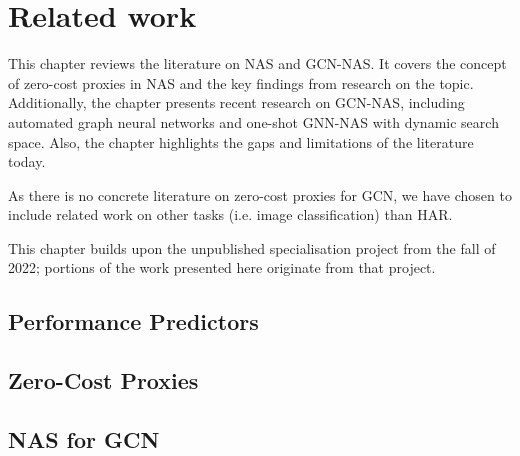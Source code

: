 \chapter{Related work}\label{chapter3}

This chapter reviews the literature on \gls{NAS} and \gls{GCN}-\gls{NAS}. It covers the concept of zero-cost proxies in \gls{NAS} and the key findings from research on the topic. Additionally, the chapter presents recent research on \gls{GCN}-\gls{NAS}, including automated graph neural networks and one-shot \gls{GNN}-\gls{NAS} with dynamic search space. Also, the chapter highlights the gaps and limitations of the literature today.  

As there is no concrete literature on zero-cost proxies for GCN, we have chosen to include related work on other tasks (i.e. image classification) than HAR.

This chapter builds upon the unpublished specialisation project from the fall of 2022; portions of the work presented here originate from that project.

\section{Performance Predictors}\label{sec:rel_performance}

\section{Zero-Cost Proxies}




\section{NAS for GCN}\label{sec:nas_gcn}



